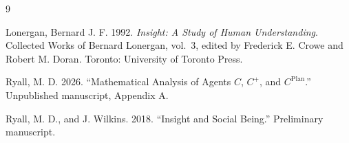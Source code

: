 \documentclass[11pt]{article}
\begin{document}
\begin{thebibliography}{9}

Lonergan, Bernard J. F. 1992.
\newblock \emph{Insight: A Study of Human Understanding}.
\newblock Collected Works of Bernard Lonergan, vol.~3, edited by Frederick E.
Crowe and Robert M. Doran. Toronto: University of Toronto Press.

Ryall, M. D. 2026.
\newblock ``Mathematical Analysis of Agents $C$, $C^{+}$, and
$C^{\mathrm{Plan}}$.''
\newblock Unpublished manuscript, Appendix A.

Ryall, M. D., and J. Wilkins. 2018.
\newblock ``Insight and Social Being.''
\newblock Preliminary manuscript.

\end{thebibliography}
\end{document}
